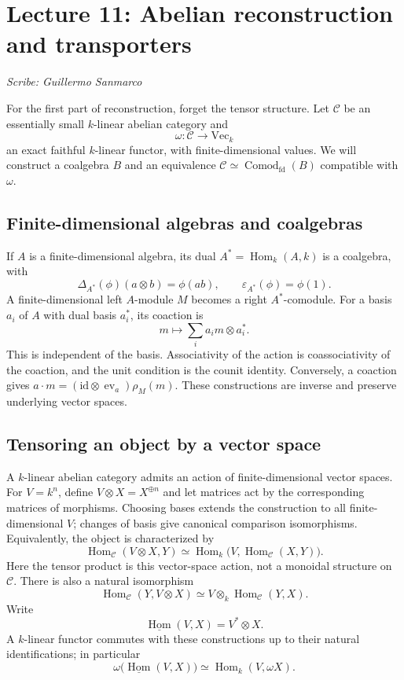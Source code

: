 \section{Lecture 11: Abelian reconstruction and transporters}\label{lec11}
\noindent\textit{Scribe: Guillermo Sanmarco}


For the first part of reconstruction, forget the tensor structure. Let $\mathcal C$ be an essentially small $k$-linear abelian category and
\[
 \omega:\mathcal C\longrightarrow\mathrm{Vec}_k
\]
an exact faithful $k$-linear functor, with finite-dimensional values. We will construct a coalgebra $B$ and an equivalence $\mathcal C\simeq\operatorname{Comod}_{\mathrm{fd}}(B)$ compatible with $\omega$.

\subsection*{Finite-dimensional algebras and coalgebras}
If $A$ is a finite-dimensional algebra, its dual $A^*=\operatorname{Hom}_k(A,k)$ is a coalgebra, with
\[
 \Delta_{A^*}(\phi)(a\otimes b)=\phi(ab),\qquad
 \varepsilon_{A^*}(\phi)=\phi(1).
\]
A finite-dimensional left $A$-module $M$ becomes a right $A^*$-comodule. For a basis $a_i$ of $A$ with dual basis $a_i^*$, its coaction is
\[
 m\longmapsto\sum_i a_i m\otimes a_i^*.
\]
This is independent of the basis. Associativity of the action is coassociativity of the coaction, and the unit condition is the counit identity. Conversely, a coaction gives $a\cdot m=(\mathrm{id}\otimes\operatorname{ev}_a)\rho_M(m)$. These constructions are inverse and preserve underlying vector spaces.

\subsection*{Tensoring an object by a vector space}
A $k$-linear abelian category admits an action of finite-dimensional vector spaces. For $V=k^n$, define $V\otimes X=X^{\oplus n}$ and let matrices act by the corresponding matrices of morphisms. Choosing bases extends the construction to all finite-dimensional $V$; changes of basis give canonical comparison isomorphisms. Equivalently, the object is characterized by
\[
 \operatorname{Hom}_{\mathcal C}(V\otimes X,Y)
 \simeq\operatorname{Hom}_k\bigl(V,\operatorname{Hom}_{\mathcal C}(X,Y)\bigr).
\]
Here the tensor product is this vector-space action, not a monoidal structure on $\mathcal C$. There is also a natural isomorphism
\[
 \operatorname{Hom}_{\mathcal C}(Y,V\otimes X)
 \simeq V\otimes_k\operatorname{Hom}_{\mathcal C}(Y,X).
\]
Write
\[
 \underline{\operatorname{Hom}}(V,X)=V^*\otimes X.
\]
A $k$-linear functor commutes with these constructions up to their natural identifications; in particular
\[
 \omega\bigl(\underline{\operatorname{Hom}}(V,X)\bigr)
 \simeq\operatorname{Hom}_k(V,\omega X).
\]

